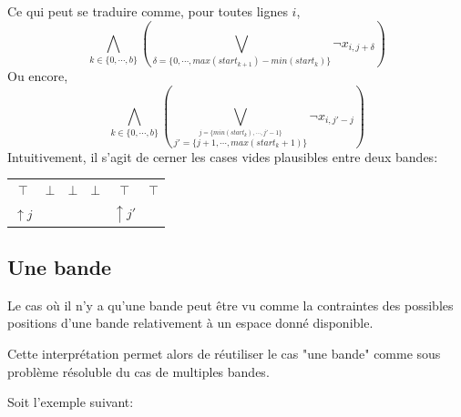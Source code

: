 \documentclass[a4paper,12pt]{report}
\newcommand\black{\cellcolor{black}}
\begin{document}
\begin{enumerate}
	Ce qui peut se traduire comme, pour toutes lignes $i$,
			$$\bigwedge_{k\in\{0,\cdots,b\}}\left( 
				\bigvee_{\delta=\{0,\cdots,max(start_{k+1})-min(start_k)\}} \lnot x_{i,j+\delta} 
			\right)$$
	Ou encore, 		
			$$\bigwedge_{k\in\{0,\cdots,b\}}\left(
				\bigvee_{
					\stackrel{j=\{min(start_k), \cdots,j'-1\}}{j'=\{j+1, \cdots,max(start_k+1)\}}
					}
				\lnot x_{i,j'-j} 
			\right)$$
	Intuitivement, il s'agit de cerner les cases vides plausibles entre deux bandes:		
			\begin{center}						
			\begin{tabular}{|c|c|c|c|c|c|}
			\hline 
			\black &   &    &   & \black & \black   \\ 			
			\hline 
			$\top$ & $\bot$ & $\bot$  & $\bot$ & $\top$ & $\top$ \\ 
			\hline  
			$\uparrow j$ & \multicolumn{3}{c|}{} & $\uparrow j'$ & \\ 
			\hline
			\end{tabular}
			\end{center}
\end{enumerate}

\subsection{Une bande}
Le cas où il n'y a qu'une bande peut être vu comme la contraintes des possibles positions d'une bande relativement à un espace donné disponible. 

Cette interprétation permet alors de réutiliser le cas "une bande" comme sous problème résoluble du cas de multiples bandes. 

Soit l'exemple suivant:
\end{document}
